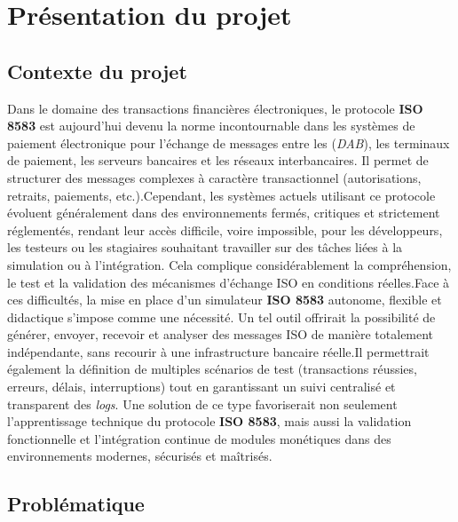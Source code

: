 \section{Présentation du projet}
\subsection{Contexte du projet}

Dans le domaine des transactions financières électroniques, le protocole \textbf{ISO 8583} est aujourd’hui devenu la norme incontournable dans les systèmes de paiement électronique pour l’échange de messages entre les (\textit{DAB}), les terminaux de paiement, les serveurs bancaires et les réseaux interbancaires. Il permet de structurer des messages complexes à caractère transactionnel (autorisations, retraits, paiements, etc.).Cependant, les systèmes actuels utilisant ce protocole évoluent généralement dans des environnements fermés, critiques et strictement réglementés, rendant leur accès difficile, voire impossible, pour les développeurs, les testeurs ou les stagiaires souhaitant travailler sur des tâches liées à la simulation ou à l’intégration. Cela complique considérablement la compréhension, le test et la validation des mécanismes d’échange ISO en conditions réelles.Face à ces difficultés, la mise en place d’un simulateur \textbf{ISO 8583} autonome, flexible et didactique s’impose comme une nécessité. Un tel outil offrirait la possibilité de générer, envoyer, recevoir et analyser des messages ISO de manière totalement indépendante, sans recourir à une infrastructure bancaire réelle.Il permettrait également la définition de multiples scénarios de test (transactions réussies, erreurs, délais, interruptions) tout en garantissant un suivi centralisé et transparent des \textit{logs}. Une solution de ce type favoriserait non seulement l’apprentissage technique du protocole \textbf{ISO 8583}, mais aussi la validation fonctionnelle et l’intégration continue de modules monétiques dans des environnements modernes, sécurisés et maîtrisés.


\subsection{Problématique}

